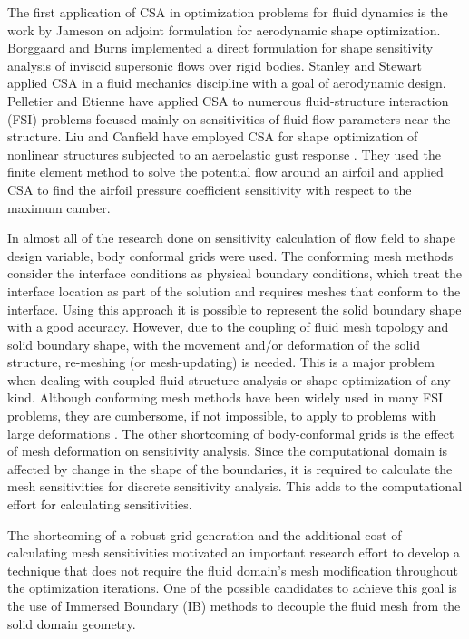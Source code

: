 The first application of CSA in optimization problems for fluid dynamics is the work by Jameson \cite{jameson1988aerodynamic} on adjoint formulation for aerodynamic shape optimization. Borggaard and Burns \cite{borggaard1995sensitivity} implemented a direct formulation for shape sensitivity analysis of inviscid supersonic flows over rigid bodies. Stanley and Stewart \cite{stanley2002design} applied CSA in a fluid mechanics discipline with a goal of aerodynamic design. Pelletier and Etienne have applied CSA to numerous fluid-structure interaction (FSI) problems \cite{etienne2005general} focused mainly on sensitivities of fluid flow parameters near the structure. Liu and Canfield have employed CSA for shape optimization of nonlinear structures subjected to an aeroelastic gust response \cite{liu2013equivalence}. They used the finite element method to solve the potential flow around an airfoil and applied CSA to find the airfoil pressure coefficient sensitivity with respect to the maximum camber. 

In almost all of the research done on sensitivity calculation of flow field to shape design variable, body conformal grids were used. The conforming mesh methods consider the interface conditions as physical boundary conditions, which treat the interface location as part of the solution and requires meshes that conform to the interface. Using this approach it is possible to represent the solid boundary shape with a good accuracy. However, due to the coupling of fluid mesh topology and solid boundary shape, with the movement and/or deformation of the solid structure, re-meshing (or mesh-updating) is needed. This is a major problem when dealing with coupled fluid-structure analysis or shape optimization of any kind. Although conforming mesh methods have been widely used in many FSI problems, they are cumbersome, if not impossible, to apply to problems with large deformations \cite{sahin2009arbitrary}. The other shortcoming of body-conformal grids is the effect of mesh deformation on sensitivity analysis. Since the computational domain is affected by change in the shape of the boundaries, it is required to calculate the mesh sensitivities \cite{liu2013boundary} for discrete sensitivity analysis. This adds to the computational effort for calculating  sensitivities.

The shortcoming of a robust grid generation and the additional cost of calculating mesh sensitivities motivated an important research effort to develop a technique that does not require the fluid domain's mesh modification throughout the optimization iterations. One of the possible candidates to achieve this goal is the use of Immersed Boundary (IB) methods to decouple the fluid mesh from the solid domain geometry.
